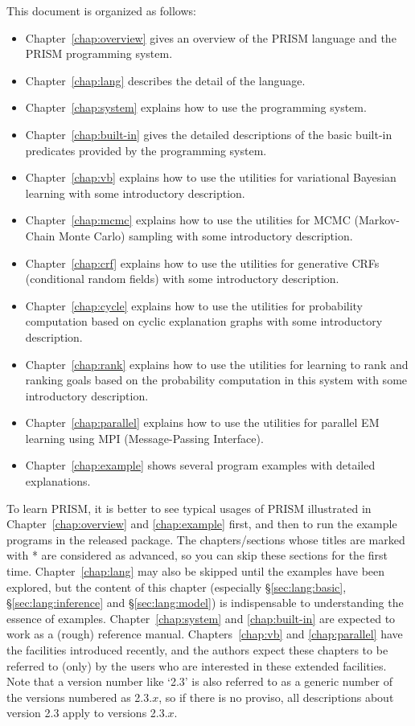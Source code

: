 \documentclass[a4paper]{report}
\newcommand{\secref}[1]{\S\ref{#1}}
\begin{document}
This document is organized as follows:
\begin{itemize}
\item
  Chapter~\ref{chap:overview} gives an overview of the PRISM language
  and the PRISM programming system.
\item
  Chapter~\ref{chap:lang} describes the detail of the language.
\item
  Chapter~\ref{chap:system} explains how to use the programming system.
\item
  Chapter~\ref{chap:built-in} gives the detailed descriptions of
  the basic built-in predicates provided by the programming system.
\item
  Chapter~\ref{chap:vb} explains how to use the utilities for
  variational Bayesian learning with some introductory description.
\item
  Chapter~\ref{chap:mcmc} explains how to use the utilities for
  MCMC (Markov-Chain Monte Carlo) sampling
  with some introductory description.
\item
  Chapter~\ref{chap:crf} explains how to use the utilities for
  generative CRFs (conditional random fields)
  with some introductory description.
\item
  Chapter~\ref{chap:cycle} explains how to use the utilities for
  probability computation based on cyclic explanation graphs
  with some introductory description.
\item
  Chapter~\ref{chap:rank} explains how to use the utilities for
  learning to rank and ranking goals based on the probability computation in this system with some introductory description.
\item
  Chapter~\ref{chap:parallel} explains how to use the utilities for
  parallel EM learning using MPI (Message-Passing Interface).
\item
  Chapter~\ref{chap:example} shows several program examples with detailed
  explanations.
\end{itemize}
To learn PRISM, it is better to see typical usages of PRISM illustrated
in Chapter~\ref{chap:overview} and \ref{chap:example} first, and then to
run the example programs in the released package.    The chapters/sections
whose titles are marked with * are considered as advanced, so you can
skip these sections for the first time.  Chapter~\ref{chap:lang} may
also be skipped until the examples have been explored, but the content
of this chapter (especially \secref{sec:lang:basic},
\secref{sec:lang:inference} and \secref{sec:lang:model})
is indispensable to understanding the essence of examples.
Chapter~\ref{chap:system} and \ref{chap:built-in} are expected to work as
a (rough) reference manual.  Chapters~\ref{chap:vb} and \ref{chap:parallel}
have the facilities introduced recently, and the authors
expect these chapters to be referred to (only) by the users who are
interested in these extended facilities.  Note that a version number like
`2.3' is also referred to as a generic number of the versions numbered as
2.3.$x$, so if there is no proviso, all descriptions about version 2.3
apply to versions 2.3.$x$.
\end{document}

